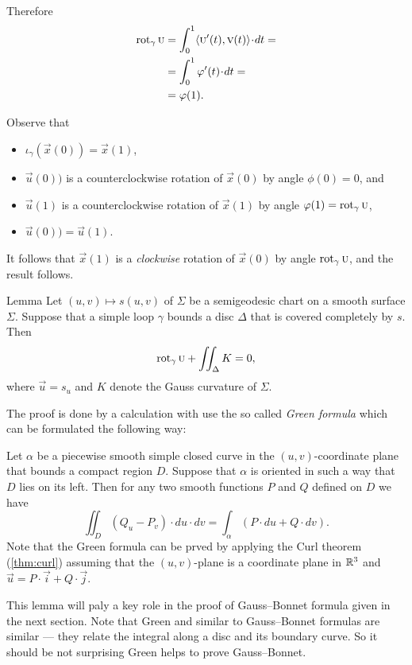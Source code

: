Therefore
\begin{align*}
\rot_\gamma\vec u&=\int_0^1\langle\vec u'(t),\vec v(t)\rangle\cdot dt=
\\
&=\int_0^1\phi'(t)\cdot dt=
\\
&=\phi(1).
\end{align*}

Observe that 
\begin{itemize}
\item $\iota_\gamma(\vec x(0))=\vec x(1)$,

\item $\vec u(0))$ is a counterclockwise rotation of $\vec x(0)$ by angle $\phi(0)=0$, and 

\item $\vec u(1)$ is a counterclockwise rotation of $\vec x(1)$ by angle $\phi(1)\z=\rot_\gamma\vec u$,

\item $\vec u(0))=\vec u(1)$.
\end{itemize}
It follows that $\vec x(1)$ is a {}\emph{clockwise} rotation of $\vec x(0)$ by angle $\mathop{\rm rot}\nolimits_\gamma\textsc u$, and the result follows.
\qeds

\begin{thm}{Lemma}\label{lem:rotation-semigeoesic}
Let $(u,v)\mapsto s(u,v)$ of $\Sigma$ be a semigeodesic chart on a smooth surface $\Sigma$.
Suppose that a simple loop $\gamma$ bounds a disc $\Delta$ that is covered completely by $s$.
Then 
\[\mathop{\rm rot}\nolimits_\gamma\textsc u+\iint_\Delta K=0,\]
where $\vec u=s_u$ and $K$ denote the Gauss curvature of $\Sigma$.
\end{thm}

The proof is done by a calculation with use the so called \emph{Green formula} which can be formulated the following way:

Let $\alpha$ be a piecewise smooth simple closed curve in the $(u,v)$-coordinate plane that bounds a compact region $D$.
Suppose that $\alpha$ is oriented in such a way that $D$ lies on its left.
Then for any two smooth functions $P$ and $Q$ defined on $D$ we have
\[\iint_D (Q_u- P_v)\cdot du\cdot dv=\int_\alpha (P\cdot du+Q\cdot dv).\]
Note that the Green formula can be prved by applying the Curl theorem (\ref{thm:curl}) assuming that the $(u,v)$-plane is a coordinate plane in $\mathbb{R}^3$ and $\vec u=P\cdot\vec i+Q\cdot \vec j$.

This lemma will paly a key role in the proof of Gauss--Bonnet formula given in the next section.
Note that Green and similar to Gauss--Bonnet formulas are similar --- they relate the integral along a disc and its boundary curve.
So it should be not surprising Green helps to prove Gauss--Bonnet.

